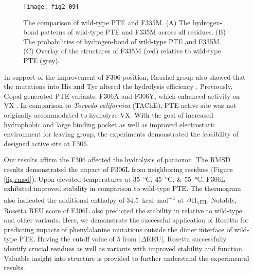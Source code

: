 \begin{refsection}
\begin{figure}[htbp] \centering \texttt{[image: fig2\_09]}
    \caption[The comparison of wild-type PTE and F335M. (A) The hydrogen-bond
    patterns of wild-type PTE and F335M across all residues. (B) The
    probabilities of hydrogen-bond of wild-type PTE and F335M. (C) Overlay of
    the structures of F335M (red) relative to wild-type PTE (grey).] {The
        comparison of wild-type PTE and F335M. (A) The hydrogen-bond patterns
        of wild-type PTE and F335M across all residues. (B) The probabilities
        of hydrogen-bond of wild-type PTE and F335M. (C) Overlay of the
        structures of F335M (red) relative to wild-type PTE (grey). }
        \label{fig:hbond-plot}
\end{figure}

In support of the improvement of F306 position, Raushel group also showed that
the mutations into His and Tyr altered the hydrolysis
efficiency \cite{Pavelka2009}. Previously, Gopal  generated PTE
variants, F306A and F306Y, which enhanced activity on VX \cite{Gopal2000}. In
comparison to \emph{Torpedo californica} (TAChE), PTE active site was not
originally accommodated to hydrolyze VX. With the goal of increased hydrophobic
and large binding pocket as well as improved electrostatic environment for
leaving group, the experiments demonstrated the feasibility of designed active
site at F306.  

Our results affirm the F306 affected the hydrolysis of paraoxon. The RMSD
results demonstrated the impact of F306L from neighboring residues (Figure
\ref{fig:rmsd}). Upon elevated temperatures at \SIlist{35;45;55}{\celsius},
F306L exhibited improved stability in comparison to wild-type PTE. The
thermogram also indicated the additional enthalpy of \SI{34.5}{kcal\per\mole}
at $\Delta$H\textsubscript{vH1}. Notably, Rosetta REU score of F306L also
predicted the stability in relative to wild-type and other variants. Here, we
demonstrate the successful application of Rosetta for predicting impacts of
phenylalanine mutations outside the dimer interface of wild-type PTE. Having
the cutoff value of 5 from |$\Delta$REU|, Rosetta successfully identify crucial
residues as well as variants with improved stability and function. Valuable
insight into structure is provided to further understand the experimental
results. 

\printbibliography[heading=subbibliography]

\end{refsection}
